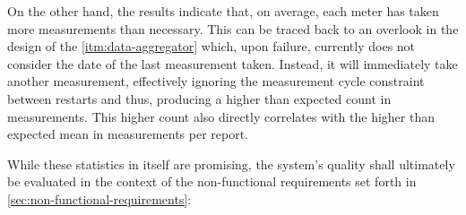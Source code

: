 On the other hand, the results indicate that, on average, each meter has taken more measurements than necessary. This can be traced back to an overlook in the design of the \ref{itm:data-aggregator} which, upon failure, currently does not consider the date of the last measurement taken. Instead, it will immediately take another measurement, effectively ignoring the measurement cycle constraint between restarts and thus, producing a higher than expected count in measurements. This higher count also directly correlates with the higher than expected mean in measurements per report.

While these statistics in itself are promising, the system's quality shall ultimately be evaluated in the context of the non-functional requirements set forth in \autoref{sec:non-functional-requirements}:


